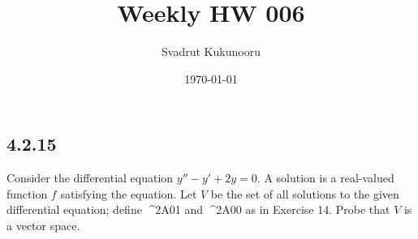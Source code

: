 \documentclass[letterpaper]{report}
\title{Weekly HW 006}
\author{Svadrut Kukunooru}
\date{\today}
\begin{document}
\begin{titlepage}
    \maketitle
\end{titlepage}
   \subsection{4.2.15}%
   \label{sub:4.2.15}
   Consider the differential equation $y'' - y' + 2y = 0$. A solution is a real-valued function $f$ satisfying the equation. Let $V$ be the set of all solutions to the given differential equation; define ^^^^2A01 and ^^^^2A00 as in Exercise 14. Probe that $V$ is a vector space.  
\end{document}

